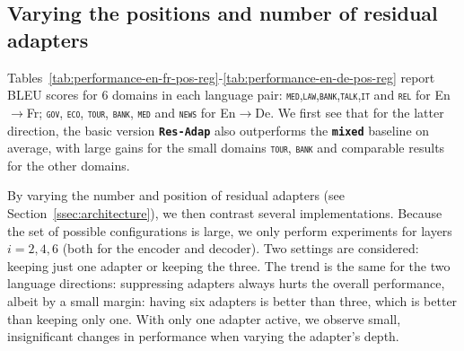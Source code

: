 \documentclass[11pt,a4paper]{article}
\newcommand{\fyDone}[1]{\done[FY]\Todo[FY:]{\textcolor{orange}{#1}}}
\newcommand{\fyFuture}[1]{\done[FY]\Todo[FY:]{\textcolor{red}{#1}}}
\newcommand{\domain}[1]{\texttt{\textsc{#1}}}
\newcommand{\system}[1]{\texttt{\textbf{#1}}}
\newcommand{\revision}[1]{\textcolor{red}{#1}}
\begin{document}
\subsection{Varying the positions and number of residual adapters}
Tables~\ref{tab:performance-en-fr-pos-reg}-\ref{tab:performance-en-de-pos-reg} report BLEU scores for 6 domains in each language pair: \domain{med},\domain{law},\domain{bank},\domain{talk},\domain{it} and \domain{rel} for En$\rightarrow$Fr; \domain{gov}, \domain{eco}, \domain{tour}, \domain{bank}, \domain{med} and \domain{news} for En$\rightarrow$De. We first see that for the latter direction, the basic version \system{Res-Adap} also outperforms the \system{mixed} baseline on average, with large gains for the small domains \domain{tour}, \domain{bank} and comparable results for the other domains.
\fyFuture{Full FT for en->DE ?}

By varying the number and position of residual adapters (see Section~\ref{ssec:architecture}), we then contrast several implementations. \fyDone{Fix style here} Because the set of possible configurations is large, we only perform experiments for layers $i= 2, 4, 6$ (both for the encoder and decoder). Two settings are considered: keeping just one adapter or keeping the three. The trend is the same for the two language directions: suppressing adapters always hurts the overall performance, albeit by a small margin: having six adapters is better than three, which is better than keeping only one. With only one adapter active, we observe small, insignificant changes in performance when varying the adapter's depth. %
\end{document}
